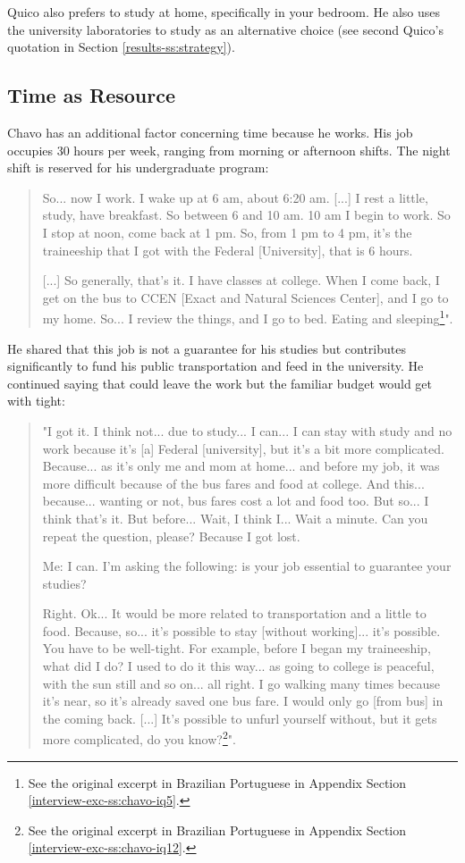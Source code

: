 Quico also prefers to study at home, specifically in your bedroom. He also uses the university laboratories to study as an alternative choice (see second Quico's quotation in Section \ref{results-ss:strategy}).

\subsection{Time as Resource}
\label{results-ss:time}

Chavo has an additional factor concerning time because he works. His job occupies 30 hours per week, ranging from morning or afternoon shifts. The night shift is reserved for his undergraduate program:
\begin{quote}
    So... now I work. I wake up at 6 am, about 6:20 am. [...] I rest a little, study, have breakfast. So between 6 and 10 am. 10 am I begin to work. So I stop at noon, come back at 1 pm. So, from 1 pm to 4 pm, it's the traineeship that I got with the Federal [University], that is 6 hours.

    [...] So generally, that's it. I have classes at college. When I come back, I get on the bus to CCEN [Exact and Natural Sciences Center], and I go to my home. So... I review the things, and I go to bed. Eating and sleeping\footnote{See the original excerpt in Brazilian Portuguese in Appendix Section \ref{interview-exc-ss:chavo-iq5}.}".    
\end{quote}
He shared that this job is not a guarantee for his studies but contributes significantly to fund his public transportation and feed in the university. He continued saying that could leave the work but the familiar budget would get with tight:
\begin{quote}
    "I got it. I think not... due to study... I can... I can stay with study and no work because it's [a] Federal [university], but it's a bit more complicated. Because... as it's only me and mom at home... and before my job, it was more difficult because of the bus fares and food at college. And this... because... wanting or not, bus fares cost a lot and food too. But so... I think that's it. But before... Wait, I think I... Wait a minute. Can you repeat the question, please? Because I got lost.

    \colorbox{black!15}{Me: I can. I'm asking the following: is your job essential to guarantee your studies?}

    Right. Ok... It would be more related to transportation and a little to food. Because, so... it's possible to stay [without working]... it's possible. You have to be well-tight. For example, before I began my traineeship, what did I do? I used to do it this way... as going to college is peaceful, with the sun still and so on... all right. I go walking many times because it's near, so it's already saved one bus fare. I would only go [from bus] in the coming back. [...] It's possible to unfurl yourself without, but it gets more complicated, do you know?\footnote{See the original excerpt in Brazilian Portuguese in Appendix Section \ref{interview-exc-ss:chavo-iq12}.}".
\end{quote}


